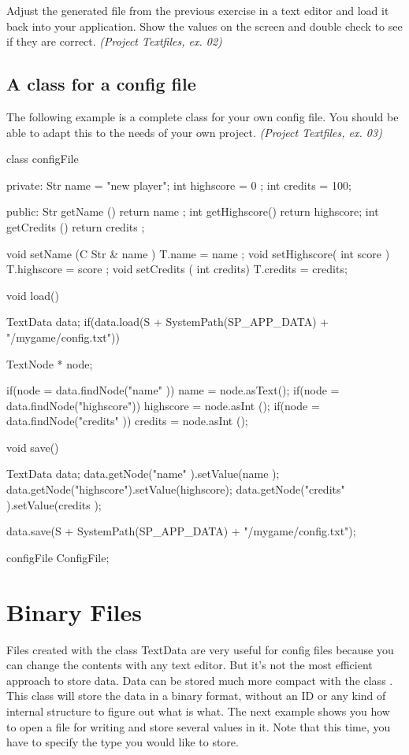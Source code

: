 \begin{exercise}
Adjust the generated file from the previous exercise in a text editor and load it back into your application. Show the values on the screen and double check to see if they are correct. \textsl{(Project Textfiles, ex. 02)}
\end{exercise}

\subsection{A class for a config file}
The following example is a complete class for your own config file. You should be able to adapt this to the needs of your own project. \textsl{(Project Textfiles, ex. 03)}

\begin{code}
class configFile {
private:
  Str name      = "new player";
	int highscore = 0  ;
	int credits   = 100;
	
public:
  Str getName     () { return name     ; }
	int getHighscore() { return highscore; }
	int getCredits  () { return credits  ; }
	
	void setName     (C Str & name   ) { T.name      = name   ; }
	void setHighscore(  int   score  ) { T.highscore = score  ; }
	void setCredits  (  int   credits) { T.credits   = credits; }
	
	void load() {
	  TextData data;
		if(data.load(S + SystemPath(SP_APP_DATA) + "/mygame/config.txt")) {
		  TextNode * node;
			
			if(node = data.findNode("name"     )) name      = node.asText();
			if(node = data.findNode("highscore")) highscore = node.asInt ();
			if(node = data.findNode("credits"  )) credits   = node.asInt ();
	  }
  }
	
	void save() {
	  TextData data;
		data.getNode("name"     ).setValue(name     );
		data.getNode("highscore").setValue(highscore);
		data.getNode("credits"  ).setValue(credits  );
		
		data.save(S + SystemPath(SP_APP_DATA) + "/mygame/config.txt");
  }
}
configFile ConfigFile;
\end{code}	

\section{Binary Files}
Files created with the class TextData are very useful for config files because you can change the contents with any text editor. But it's not the most efficient approach to store data. Data can be stored much more compact with the class . This class will store the data in a binary format, without an ID or any kind of internal structure to figure out what is what. The next example shows you how to open a file for writing and store several values in it. Note that this time, you have to specify the type you would like to store.

